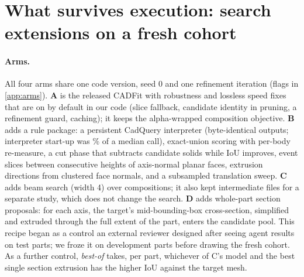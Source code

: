 \section{What survives execution: search extensions on a fresh cohort}
\label{sec:search}

\paragraph{Arms.}
All four arms share one code version, seed 0 and one refinement iteration (flags in \cref{app:arms}). \textbf{A} is the released CADFit with robustness and lossless speed fixes that are on by default in our code (slice fallback, candidate identity in pruning, a refinement guard, caching); it keeps the alpha-wrapped composition objective. \textbf{B} adds a rule package: a persistent CadQuery interpreter (byte-identical outputs; interpreter start-up was \cqStartupPct\% of a median call), exact-union scoring with per-body re-measure, a cut phase that subtracts candidate solids while IoU improves, event slices between consecutive heights of axis-normal planar faces, extrusion directions from clustered face normals, and a subsampled translation sweep. \textbf{C} adds beam search (width 4) over compositions; it also kept intermediate files for a separate study, which does not change the search. \textbf{D} adds whole-part section proposals: for each axis, the target's mid-bounding-box cross-section, simplified and extruded through the full extent of the part, enters the candidate pool. This recipe began as a control an external reviewer designed after seeing agent results on test parts; we froze it on development parts before drawing the fresh cohort. As a further control, \emph{best-of} takes, per part, whichever of C's model and the best single section extrusion has the higher IoU against the target mesh.

